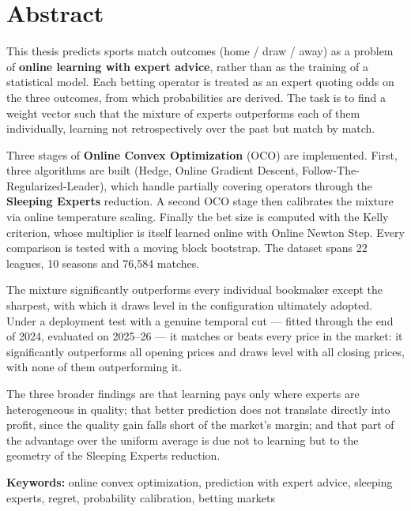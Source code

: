 \documentclass[12pt,a4paper,oneside]{report}
\renewcommand{\_}{\oldunderscore\allowbreak}
\theoremstyle{definition}
\theoremstyle{plain}
\theoremstyle{remark}
\begin{document}
\cleardoublepage

\chapter*{Abstract}

This thesis predicts sports match outcomes (home / draw / away) as a problem of
\textbf{online learning with expert advice}, rather than as the training of a statistical
model. Each betting operator is treated as an expert quoting odds on the three outcomes,
from which probabilities are derived. The task is to find a weight vector such that the
mixture of experts outperforms each of them individually, learning not retrospectively over
the past but match by match.

Three stages of \textbf{Online Convex Optimization} (OCO) are implemented. First, three
algorithms are built (Hedge, Online Gradient Descent, Follow-The-Regularized-Leader), which
handle partially covering operators through the \textbf{Sleeping Experts} reduction. A second
OCO stage then calibrates the mixture via online temperature scaling. Finally the bet size is
computed with the Kelly criterion, whose multiplier is itself learned online with Online
Newton Step. Every comparison is tested with a moving block bootstrap. The dataset spans
22 leagues, 10 seasons and 76,584 matches.

The mixture significantly outperforms every individual bookmaker except the sharpest, with
which it draws level in the configuration ultimately adopted. Under a deployment test with a
genuine temporal cut --- fitted through the end of 2024, evaluated on 2025--26 --- it
matches or beats every price in the market: it significantly outperforms all opening prices
and draws level with all closing prices, with none of them outperforming it.

The three broader findings are that learning pays only where experts are heterogeneous in
quality; that better prediction does not translate directly into profit, since the quality
gain falls short of the market's margin; and that part of the advantage over the uniform
average is due not to learning but to the geometry of the Sleeping Experts reduction.

\vspace{1em}
\noindent\textbf{Keywords:} online convex optimization, prediction with expert advice,
sleeping experts, regret, probability calibration, betting markets

\cleardoublepage
\tableofcontents
\cleardoublepage
\end{document}
